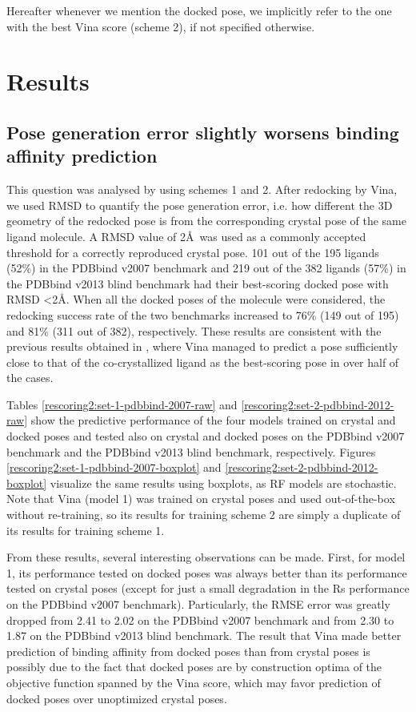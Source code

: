 \documentclass[twocolumn]{bmcart}
\begin{document}
Hereafter whenever we mention the docked pose, we implicitly refer to the one with the best Vina score (scheme 2), if not specified otherwise.

\section*{Results}

\subsection*{Pose generation error slightly worsens binding affinity prediction}

This question was analysed by using schemes 1 and 2. After redocking by Vina, we used RMSD to quantify the pose generation error, i.e. how different the 3D geometry of the redocked pose is from the corresponding crystal pose of the same ligand molecule. A RMSD value of 2\AA\ was used as a commonly accepted threshold for a correctly reproduced crystal pose. 101 out of the 195 ligands (52\%) in the PDBbind v2007 benchmark and 219 out of the 382 ligands (57\%) in the PDBbind v2013 blind benchmark had their best-scoring docked pose with RMSD \textless 2\AA. When all the docked poses of the molecule were considered, the redocking success rate of the two benchmarks increased to 76\% (149 out of 195) and 81\% (311 out of 382), respectively. These results are consistent with the previous results obtained in \cite{1362}, where Vina managed to predict a pose sufficiently close to that of the co-crystallized ligand as the best-scoring pose in over half of the cases.

Tables \ref{rescoring2:set-1-pdbbind-2007-raw} and \ref{rescoring2:set-2-pdbbind-2012-raw} show the predictive performance of the four models trained on crystal and docked poses and tested also on crystal and docked poses on the PDBbind v2007 benchmark and the PDBbind v2013 blind benchmark, respectively. Figures \ref{rescoring2:set-1-pdbbind-2007-boxplot} and \ref{rescoring2:set-2-pdbbind-2012-boxplot} visualize the same results using boxplots, as RF models are stochastic. Note that Vina (model 1) was trained on crystal poses and used out-of-the-box without re-training, so its results for training scheme 2 are simply a duplicate of its results for training scheme 1.

From these results, several interesting observations can be made. First, for model 1, its performance tested on docked poses was always better than its performance tested on crystal poses (except for just a small degradation in the Rs performance on the PDBbind v2007 benchmark). Particularly, the RMSE error was greatly dropped from 2.41 to 2.02 on the PDBbind v2007 benchmark and from 2.30 to 1.87 on the PDBbind v2013 blind benchmark. The result that Vina made better prediction of binding affinity from docked poses than from crystal poses is possibly due to the fact that docked poses are by construction optima of the objective function spanned by the Vina score, which may favor prediction of docked poses over unoptimized crystal poses.
\end{document}
